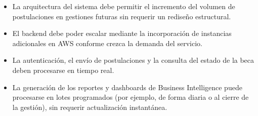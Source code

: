 
\begin{itemize}
    \item La arquitectura del sistema debe permitir el incremento del volumen de postulaciones en gestiones futuras sin requerir un rediseño estructural.
    \item El backend debe poder escalar mediante la incorporación de instancias adicionales en AWS conforme crezca la demanda del servicio.
\end{itemize}


\begin{itemize}
    \item La autenticación, el envío de postulaciones y la consulta del estado de la beca deben procesarse en tiempo real.
    \item La generación de los reportes y dashboards de Business Intelligence puede procesarse en lotes programados (por ejemplo, de forma diaria o al cierre de la gestión), sin requerir actualización instantánea.
\end{itemize}
